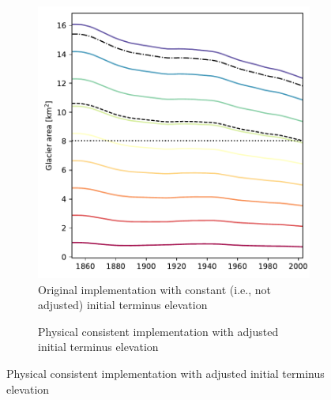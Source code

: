         \begin{figure}[ht]
          \centering

          \begin{subfigure}[b]{0.3\textwidth}
            \caption{Original implementation with constant (i.e., not adjusted) initial terminus elevation}
            \label{fig:start_area:original}
            \centering
            \includegraphics[width=\textwidth]{../plots/start_area/RGI60-11.00897_original.pdf}
          \end{subfigure}
          \hfill
          \begin{subfigure}[b]{0.3\textwidth}
            \caption{Physical consistent implementation with adjusted initial terminus elevation}
            \label{fig:start_area:overturn}
            \centering

\end{subfigure}
\end{figure}
